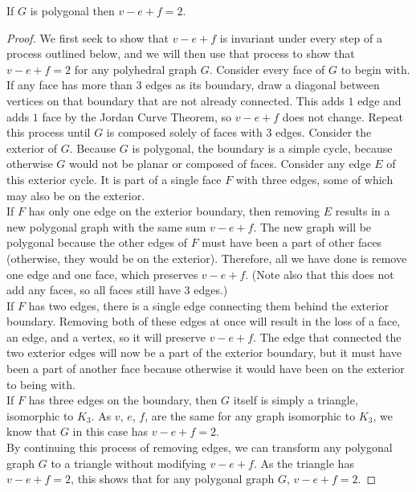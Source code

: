 \begin{theorem}[Euler]\label{thm:euler} If $G$ is polygonal then $v-e+f = 2$.
\end{theorem}
\begin{proof}
  We first seek to show that $v - e + f$ is invariant under every step of a process outlined below, and we will then use that process to show that $v - e + f = 2$ for any polyhedral graph $G$. 
  Consider every face of $G$ to begin with. If any face has more than $3$ edges as its boundary, draw a diagonal between vertices on that boundary that are not already connected. This adds $1$ edge and adds $1$ face by the Jordan Curve Theorem, so $v - e + f$ does not change. Repeat this process until $G$ is composed solely of faces with $3$ edges. Consider the exterior of $G$. Because $G$ is polygonal, the boundary is a simple cycle, because otherwise $G$ would not be planar or composed of faces. Consider any edge $E$ of this exterior cycle. It is part of a single face $F$ with three edges, some of which may also be on the exterior. \\
  If $F$ has only one edge on the exterior boundary, then removing $E$ results in a new polygonal graph with the same sum $v - e + f$. The new graph will be polygonal because the other edges of $F$ must have been a part of other faces (otherwise, they would be on the exterior). Therefore, all we have done is remove one edge and one face, which preserves $v - e + f$. (Note also that this does not add any faces, so all faces still have $3$ edges.) \\
  If $F$ has two edges, there is a single edge connecting them behind the exterior boundary. Removing both of these edges at once will result in the loss of a face, an edge, and a vertex, so it will preserve $v - e + f$. The edge that connected the two exterior edges will now be a part of the exterior boundary, but it must have been a part of another face because otherwise it would have been on the exterior to being with. \\
  If $F$ has three edges on the boundary, then $G$ itself is simply a triangle, isomorphic to $K_3$. As $v$, $e$, $f$, are the same for any graph isomorphic to $K_3$, we know that $G$ in this case has $v - e + f = 2$. \\
  By continuing this process of removing edges, we can transform any polygonal graph $G$ to a triangle without modifying $v - e + f$. As the triangle has $v - e + f = 2$, this shows that for any polygonal graph $G$, $v - e + f = 2$.
  
\end{proof}
